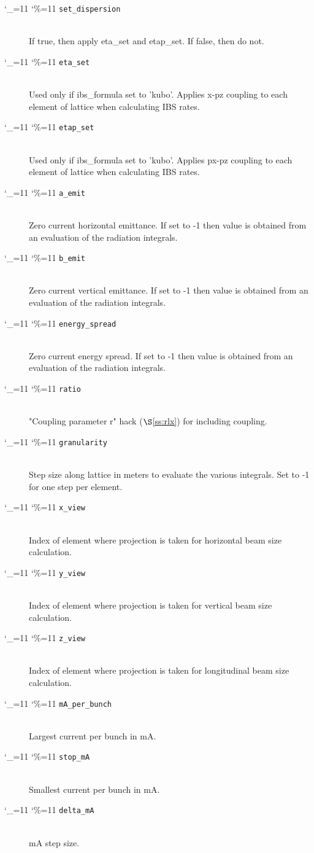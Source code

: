 \documentclass[11pt]{article}
\newcommand{\sref}[1]{$\S$\ref{#1}}
\newcommand\ttcmd{\begingroup\catcode`\_=11 \catcode`\%=11 \dottcmd}
\newcommand\dottcmd[1]{\texttt{#1}\endgroup}
\newcommand{\vn}{\ttcmd}
\newcommand{\Newline}{\hfil \\}
\begin{document}
\begin{description}
  \item[\vn{set_dispersion}] \Newline
If true, then apply eta_set and etap_set.
If false, then do not.

  \item[\vn{eta_set}] \Newline
Used only if ibs_formula set to 'kubo'.
Applies x-pz coupling to each
element of lattice when calculating IBS rates.

  \item[\vn{etap_set}] \Newline
Used only if ibs_formula set to 'kubo'. Applies px-pz coupling to
each element of lattice when calculating IBS rates.

  \item[\vn{a_emit}] \Newline
Zero current horizontal emittance. If set to -1 then value is 
obtained from an evaluation of the radiation integrals.

  \item[\vn{b_emit}] \Newline
Zero current vertical emittance. If set to -1 then value is 
obtained from an evaluation of the radiation integrals.

  \item[\vn{energy_spread}] \Newline
Zero current energy spread. If set to -1 then value is 
obtained from an evaluation of the radiation integrals.

  \item[\vn{ratio}] \Newline
"Coupling parameter r" hack (\sref{ss:rlx}) for including coupling.

  \item[\vn{granularity}] \Newline
Step size along lattice in meters to evaluate the various 
integrals.  Set to -1 for one step per element.

  \item[\vn{x_view}] \Newline
Index of element where projection is taken for horizontal beam size
calculation.

  \item[\vn{y_view}] \Newline
Index of element where projection is taken for vertical beam size
calculation.

  \item[\vn{z_view}] \Newline
Index of element where projection is taken for longitudinal beam size
calculation.

  \item[\vn{mA_per_bunch}] \Newline
Largest current per bunch in mA.

  \item[\vn{stop_mA}] \Newline
Smallest current per bunch in mA.

  \item[\vn{delta_mA}] \Newline
mA step size.

  \end{description}
\end{document}
